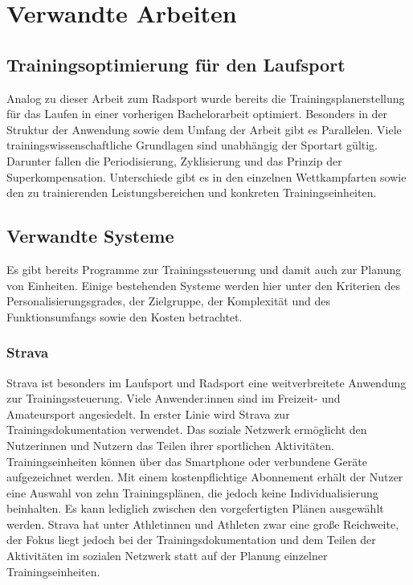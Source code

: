 \chapter{Verwandte Arbeiten}
\label{sec:verwandt}

\section{Trainingsoptimierung für den Laufsport}
\label{sec:verwandt:sec1}
Analog zu dieser Arbeit zum Radsport wurde bereits die Trainingsplanerstellung für das Laufen in einer vorherigen Bachelorarbeit optimiert. Besonders in der Struktur der Anwendung sowie dem Umfang der Arbeit gibt es Parallelen. Viele trainingswissenschaftliche Grundlagen sind unabhängig der Sportart gültig. Darunter fallen die Periodisierung, Zyklisierung und das Prinzip der Superkompensation. Unterschiede gibt es in den einzelnen Wettkampfarten sowie den zu trainierenden Leistungsbereichen und konkreten Trainingseinheiten.

\section{Verwandte Systeme}
Es gibt bereits Programme zur Trainingssteuerung und damit auch zur Planung von Einheiten. Einige bestehenden Systeme werden hier unter den Kriterien des Personalisierungsgrades, der Zielgruppe, der Komplexität und des Funktionsumfangs sowie den Kosten betrachtet.

\subsection{Strava}
Strava\cite{StravaWeb} ist besonders im Laufsport und Radsport eine weitverbreitete Anwendung zur Trainingssteuerung. Viele Anwender:innen sind im Freizeit- und Amateursport angesiedelt. In erster Linie wird Strava zur Trainingsdokumentation verwendet. Das soziale Netzwerk ermöglicht den Nutzerinnen und  Nutzern das Teilen ihrer sportlichen Aktivitäten. Trainingseinheiten können über das Smartphone oder verbundene Geräte aufgezeichnet werden. Mit einem kostenpflichtige Abonnement erhält der Nutzer eine Auswahl von zehn Trainingsplänen, die jedoch keine Individualisierung beinhalten. Es kann lediglich zwischen den vorgefertigten Plänen ausgewählt werden. Strava hat unter Athletinnen und Athleten zwar eine große Reichweite, der Fokus liegt jedoch bei der Trainingsdokumentation und dem Teilen der Aktivitäten im sozialen Netzwerk statt auf der Planung einzelner Trainingseinheiten.

